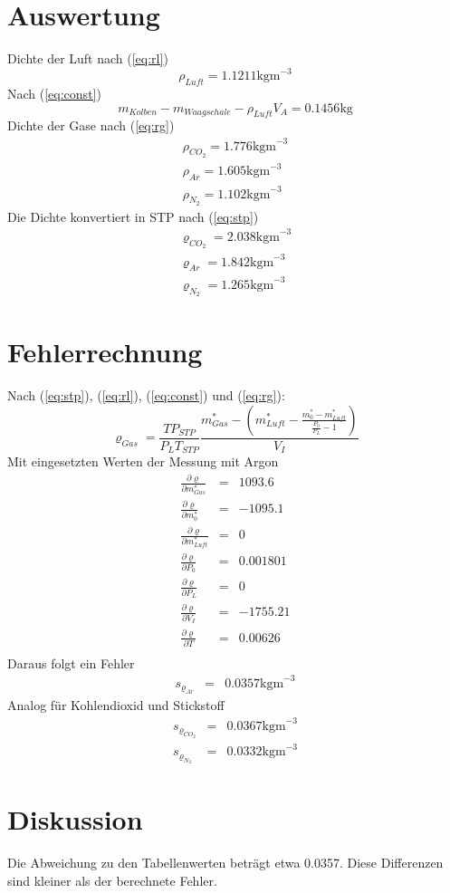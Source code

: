 \documentclass[12pt,a4paper]{article}
\begin{document}
\section*{Auswertung}
Dichte der Luft nach (\ref{eq:rl})
\[ \rho_{Luft} = 1.1211 \mbox{kgm}^{-3} \]
Nach (\ref{eq:const})
\[ m_{Kolben} - m_{Waagschale} - \rho_{Luft} V_A = 0.1456 \mbox{kg} \]
Dichte der Gase nach (\ref{eq:rg})
\begin{eqnarray*}
\rho_{CO_2} = 1.776 \mbox{kgm}^{-3} \\
\rho_{Ar} = 1.605 \mbox{kgm}^{-3} \\
\rho_{N_2} = 1.102 \mbox{kgm}^{-3}
\end{eqnarray*}
Die Dichte konvertiert in STP nach (\ref{eq:stp})
\begin{eqnarray*}
\varrho_{CO_2} = 2.038 \mbox{kgm}^{-3} \\
\varrho_{Ar} = 1.842 \mbox{kgm}^{-3} \\
\varrho_{N_2} = 1.265 \mbox{kgm}^{-3}
\end{eqnarray*}


\section*{Fehlerrechnung}
Nach (\ref{eq:stp}), (\ref{eq:rl}), (\ref{eq:const}) und (\ref{eq:rg}):
\[ \varrho _{Gas} = \frac{TP_{STP}}{P_L T_{STP}} \frac{m^*_{Gas} - \left(  m^*_{Luft} - \frac{m^*_0 - m^*_{Luft}}{\frac{P_0}{P_L}-1}\right) }{V_I} \]
Mit eingesetzten Werten der Messung mit Argon
\begin{eqnarray*}
\frac{\partial \varrho}{\partial m^*_{Gas}} & = & 1093.6 \\
\frac{\partial \varrho}{\partial m^*_{0}} & = & -1095.1 \\
\frac{\partial \varrho}{\partial m^*_{Luft}} & = & 0 \\
\frac{\partial \varrho}{\partial P_0} & = & 0.001801 \\
\frac{\partial \varrho}{\partial P_L} & = & 0 \\
\frac{\partial \varrho}{\partial V_I} & = & -1755.21 \\
\frac{\partial \varrho}{\partial T} & = & 0.00626 \\
\end{eqnarray*}
Daraus folgt ein Fehler
\begin{eqnarray*}
s_{\varrho_{Ar}} & = & 0.0357 \mbox{kgm}^{-3}
\end{eqnarray*}
Analog für Kohlendioxid und Stickstoff
\begin{eqnarray*}
s_{\varrho_{CO_2}} & = & 0.0367 \mbox{kgm}^{-3}\\
s_{\varrho_{N_2}} & = & 0.0332 \mbox{kgm}^{-3}
\end{eqnarray*}

\section*{Diskussion}
Die Abweichung zu den Tabellenwerten betr\"agt etwa 0.0357. Diese Differenzen sind kleiner als der berechnete Fehler.
\end{document}
